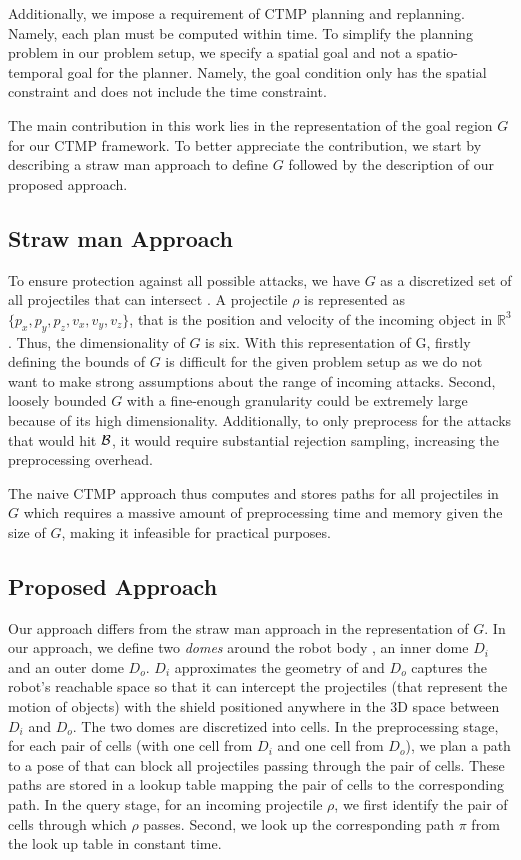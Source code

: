 \documentclass[a4paper]{report}
\begin{document}
Additionally, we impose a requirement of CTMP planning and replanning. Namely, each plan must be computed within \Tbound time. To simplify the planning problem in our problem setup, we specify a spatial goal and not a spatio-temporal goal for the planner. Namely, the goal condition only has the spatial constraint and does not include the time constraint.

The main contribution in this work lies in the representation of the goal region $G$ for our CTMP framework. To better appreciate the contribution, we start by describing a straw man approach to define $G$ followed by the description of our proposed approach.

\subsection{Straw man Approach}
To ensure protection against all possible attacks, we have $G$ as a discretized set of all projectiles that can intersect \calB. A projectile $\rho$ is represented as $\{p_x,p_y,p_z,v_x,v_y,v_z\}$, that is the  position and velocity of the incoming object in $\mathbb{R}^3$. Thus, the dimensionality of $G$ is six. With this representation of G, firstly defining the bounds of $G$ is difficult for the given problem setup as we do not want to make strong assumptions about the range of incoming attacks. Second, loosely bounded $G$ with a fine-enough granularity could be extremely large because of its high dimensionality.
Additionally, to only preprocess for the attacks that would hit $\mathcal{B}$, it would require substantial rejection sampling, increasing the preprocessing overhead.

The naive CTMP approach thus computes and stores paths for all projectiles in $G$ which requires a massive amount of preprocessing time and memory given the size of $G$, making it infeasible for practical purposes.

\subsection{Proposed Approach}
Our approach differs from the straw man approach in the representation of $G$. In our approach, we define two \emph{domes} around the robot body \calB, an inner dome $D_i$ and an outer dome $D_o$. $D_i$ approximates the geometry of \calB and $D_o$ captures the robot's reachable space so that it can intercept the projectiles (that represent the motion of objects) with the shield \calS positioned anywhere in the 3D space between $D_i$ and $D_o$. The two domes are discretized into cells. In the preprocessing stage, for each pair of cells (with one cell from $D_i$ and one cell from $D_o$), we plan a path to a pose of \calS that can block all projectiles passing through the pair of cells. These paths are stored in a lookup table mapping the pair of cells to the corresponding path. In the query stage, for an incoming projectile $\rho$, we first identify the pair of cells through which $\rho$ passes. Second, we look up the corresponding path $\pi$ from the look up table in constant time. 
\end{document}
